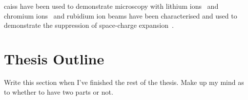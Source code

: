 \Glspl{cais} have been used to demonstrate microscopy with lithium ions~\cite{knuffman_nanoscale_2011} and chromium ions~\cite{steele_focused_2010} and rubidium ion beams have been characterised and used to demonstrate the suppression of space-charge expansion~\cite{murphy_detailed_2014,thompson_suppression_2016}.

\section{Thesis Outline}

{\color{red} Write this section when I've finished the rest of the thesis. Make up my mind as to whether to have two parts or not.}



